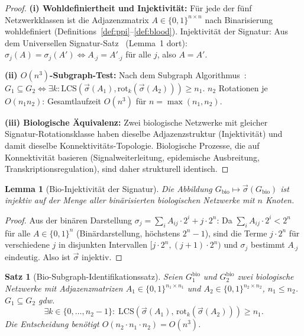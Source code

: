 ﻿\documentclass[a4paper,12pt]{article}
\theoremstyle{plain}
\newtheorem{satz}{Satz}
\newtheorem{lemma}{Lemma}
\theoremstyle{definition}
\theoremstyle{remark}
\newcommand{\Gbio}{G_{\mathrm{bio}}}
\newcommand{\sigvec}{\vec{\sigma}}
\begin{document}
\begin{proof}
\textbf{(i) Wohldefiniertheit und Injektivit\"at:}
F\"ur jede der f\"unf Netzwerkklassen ist die Adjazenzmatrix $A \in \{0,1\}^{n\times n}$
nach Binarisierung wohldefiniert (Definitions~\ref{def:ppi}--\ref{def:blood}).
Injektivit\"at der Signatur: Aus dem Universellen Signatur-Satz~\cite{epp2026ust}
(Lemma~1 dort): $\sigma_j(A) = \sigma_j(A') \Leftrightarrow A_{\cdot j} = A'_{\cdot j}$
f\"ur alle $j$, also $A = A'$.

\textbf{(ii) $O(n^3)$-Subgraph-Test:}
Nach dem Subgraph Algorithmus~\cite{epp2026subgraph}:
$G_1 \subseteq G_2 \Leftrightarrow \exists k: \mathrm{LCS}(\sigvec(A_1), \mathrm{rot}_k(\sigvec(A_2))) \geq n_1$.
$n_2$ Rotationen je $O(n_1 n_2)$: Gesamtlaufzeit $O(n^3)$ f\"ur $n = \max(n_1,n_2)$.

\textbf{(iii) Biologische \"Aquivalenz:}
Zwei biologische Netzwerke mit gleicher Signatur-Rotationsklasse haben
dieselbe Adjazenzstruktur (Injektivit\"at) und damit dieselbe
Konnektivit\"ats-Topologie. Biologische Prozesse, die auf Konnektivit\"at
basieren (Signalweiterleitung, epidemische Ausbreitung, Transkriptionsregulation),
sind daher strukturell identisch.
\end{proof}

\begin{lemma}[Bio-Injektivit\"at der Signatur]
\label{lem:bio_inj}
Die Abbildung $\Gbio \mapsto \sigvec(\Gbio)$ ist injektiv auf der Menge
aller bin\"arisierten biologischen Netzwerke mit $n$ Knoten.
\end{lemma}

\begin{proof}
Aus der bin\"aren Darstellung $\sigma_j = \sum_i A_{ij}\cdot 2^i + j\cdot 2^n$:
Da $\sum_i A_{ij}\cdot 2^i < 2^n$ f\"ur alle $A \in \{0,1\}^n$
(Bin\"ardarstellung, h\"ochstens $2^n - 1$), sind die Terme
$j\cdot 2^n$ f\"ur verschiedene $j$ in disjunkten Intervallen
$[j\cdot 2^n, (j+1)\cdot 2^n)$ und $\sigma_j$ bestimmt $A_{\cdot j}$
eindeutig. Also ist $\sigvec$ injektiv.
\end{proof}

\begin{satz}[Bio-Subgraph-Identifikationssatz]
\label{satz:bio_subgraph}
Seien $G_1^{\mathrm{bio}}$ und $G_2^{\mathrm{bio}}$ zwei biologische Netzwerke
mit Adjazenzmatrizen $A_1 \in \{0,1\}^{n_1 \times n_1}$ und
$A_2 \in \{0,1\}^{n_2 \times n_2}$, $n_1 \leq n_2$.
$G_1 \subseteq G_2$ gdw.\
\[
\exists k \in \{0,\ldots,n_2-1\}:\;
\mathrm{LCS}\!\left(\sigvec(A_1),\, \mathrm{rot}_k(\sigvec(A_2))\right) \geq n_1.
\]
Die Entscheidung ben\"otigt $O(n_2 \cdot n_1 \cdot n_2) = O(n^3)$.
\end{satz}
\end{document}
